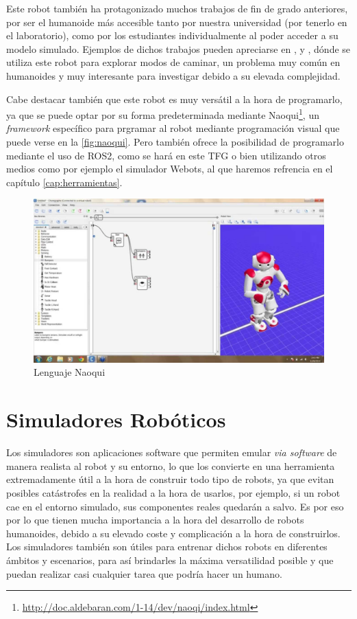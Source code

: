 Este robot también ha protagonizado muchos trabajos de fin de grado anteriores, por ser el humanoide más accesible tanto por nuestra universidad (por tenerlo en el laboratorio), como por los estudiantes individualmente al poder acceder a su modelo simulado. Ejemplos de dichos trabajos pueden apreciarse en \cite{tfg_caminata_nao}, y  \cite{tfg_caminatas_ondas}, dónde se utiliza este robot para explorar  modos de caminar, un problema muy común en humanoides y muy interesante para investigar debido a su elevada complejidad.

Cabe destacar también que este robot es muy versátil a la hora de programarlo, ya que se puede optar por su forma predeterminada mediante Naoqui\footnote{\url{http://doc.aldebaran.com/1-14/dev/naoqi/index.html}}, un \textit{framework} específico para prgramar al robot mediante programación visual que puede verse en la \autoref{fig:naoqui}. Pero también ofrece la posibilidad de programarlo mediante el uso de ROS2, como se hará en este TFG o bien utilizando otros medios como por ejemplo el simulador Webots, al que haremos refrencia en el capítulo \ref{cap:herramientas}.

\begin{figure}[H]
    \centering
    \includegraphics[width=1\textwidth]{figures/cap_1/naoqui.jpg}
    \caption{Lenguaje Naoqui}
    \label{fig:naoqui}
\end{figure}

\section{Simuladores Robóticos}

Los simuladores son aplicaciones software que permiten emular \textit{via software} de manera realista al robot y su entorno, lo que los convierte en una herramienta extremadamente útil a la hora de construir todo tipo de robots, ya que evitan posibles catástrofes en la realidad a la hora de usarlos, por ejemplo, si un robot cae en el entorno simulado, sus componentes reales quedarán a salvo. Es por eso por lo que tienen mucha importancia a la hora del desarrollo de robots humanoides, debido a su elevado coste y complicación a la hora de construirlos. Los simuladores también son útiles para entrenar dichos robots en diferentes ámbitos y escenarios, para así brindarles la máxima versatilidad posible y que puedan realizar casi cualquier tarea que podría hacer un humano.

